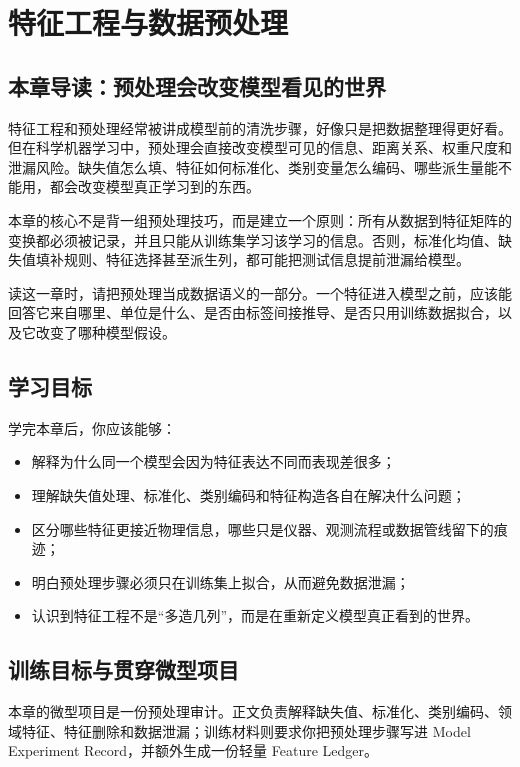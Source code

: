 \chapter{特征工程与数据预处理}

\section{本章导读：预处理会改变模型看见的世界}

特征工程和预处理经常被讲成模型前的清洗步骤，好像只是把数据整理得更好看。但在科学机器学习中，预处理会直接改变模型可见的信息、距离关系、权重尺度和泄漏风险。缺失值怎么填、特征如何标准化、类别变量怎么编码、哪些派生量能不能用，都会改变模型真正学习到的东西。

本章的核心不是背一组预处理技巧，而是建立一个原则：所有从数据到特征矩阵的变换都必须被记录，并且只能从训练集学习该学习的信息。否则，标准化均值、缺失值填补规则、特征选择甚至派生列，都可能把测试信息提前泄漏给模型。

读这一章时，请把预处理当成数据语义的一部分。一个特征进入模型之前，应该能回答它来自哪里、单位是什么、是否由标签间接推导、是否只用训练数据拟合，以及它改变了哪种模型假设。

\section{学习目标}

学完本章后，你应该能够：

\begin{itemize}
    \item 解释为什么同一个模型会因为特征表达不同而表现差很多；
    \item 理解缺失值处理、标准化、类别编码和特征构造各自在解决什么问题；
    \item 区分哪些特征更接近物理信息，哪些只是仪器、观测流程或数据管线留下的痕迹；
    \item 明白预处理步骤必须只在训练集上拟合，从而避免数据泄漏；
    \item 认识到特征工程不是“多造几列”，而是在重新定义模型真正看到的世界。
\end{itemize}

\section{训练目标与贯穿微型项目}

本章的微型项目是一份预处理审计。正文负责解释缺失值、标准化、类别编码、领域特征、特征删除和数据泄漏；训练材料则要求你把预处理步骤写进 Model Experiment Record，并额外生成一份轻量 Feature Ledger。


